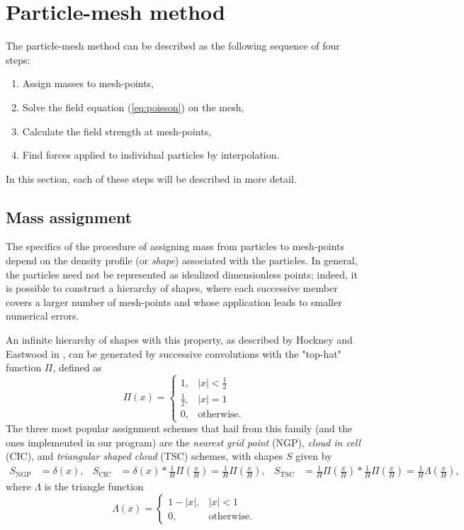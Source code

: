 \section{Particle-mesh method}
The particle-mesh method can be described as the following sequence of four steps:
\begin{enumerate}
    \item Assign masses to mesh-points,
    \item Solve the field equation (\autoref{eq:poisson}) on the mesh,
    \item Calculate the field strength at mesh-points,
    \item Find forces applied to individual particles by interpolation.
\end{enumerate}
In this section, each of these steps will be described in more detail.

\subsection{Mass assignment}\label{subsec:mass-assignment}
The specifics of the procedure of assigning mass from particles to mesh-points depend on the density profile (or \textit{shape}) associated with the particles.
In general, the particles need not be represented as idealized dimensionless points;
indeed, it is possible to construct a hierarchy of shapes, where each successive member covers a larger number of mesh-points and whose application leads to smaller numerical errors.

An infinite hierarchy of shapes with this property, as described by Hockney and Eastwood in \cite{Hockney1988}, can be generated by successive convolutions with the "top-hat" function $\Pi$, defined as
\begin{equation*}
    \Pi(x) = \begin{cases}
        1,           & |x| < \frac{1}{2} \\
        \frac{1}{2}, & |x| = 1           \\
        0,           & \text{otherwise}.
    \end{cases}
\end{equation*}
The three most popular assignment schemes that hail from this family (and the ones implemented in our program) are the \textit{nearest grid point} (NGP), \textit{cloud in cell} (CIC), and \textit{triangular shaped cloud} (TSC) schemes, with shapes $S$ given by
\begin{align*}
    S_\text{NGP} & = \delta(x), & S_\text{CIC} & = \delta(x) * \frac{1}{H} \Pi\left(\frac{x}{H}\right) = \frac{1}{H}\Pi\left(\frac{x}{H}\right), & S_\text{TSC} & = \frac{1}{H}\Pi\left(\frac{x}{H}\right) * \frac{1}{H}\Pi\left(\frac{x}{H}\right) = \frac{1}{H}\Lambda \left(\frac{x}{H}\right),
\end{align*}
where $\Lambda$ is the triangle function
\begin{equation*}
    \Lambda(x) = \begin{cases}
        1 - |x|, & |x| < 1           \\
        0,       & \text{otherwise}.
    \end{cases}
\end{equation*}


